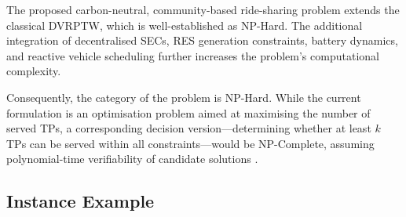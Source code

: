 The proposed carbon-neutral, community-based ride-sharing problem extends the classical DVRPTW, which is well-established as NP-Hard. The additional integration of decentralised SECs, RES generation constraints, battery dynamics, and reactive vehicle scheduling further increases the problem's computational complexity.

Consequently, the category of the problem is NP-Hard. While the current formulation is an optimisation problem aimed at maximising the number of served TPs, a corresponding decision version—determining whether at least $k$ TPs can be served within all constraints—would be NP-Complete, assuming polynomial-time verifiability of candidate solutions \cite{hasan2020commute}.












\subsection{Instance Example}
\label{instance_example}

